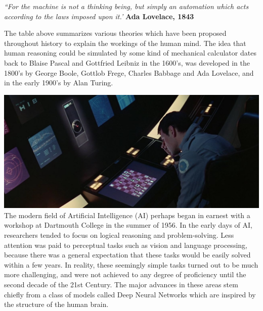 \documentclass[11pt]{article}
\begin{document}
\begin{displayquote}
\emph{``For the machine is not a thinking being, but simply an automation which acts
according to the laws imposed upon it.'}
\textbf{Ada Lovelace, 1843}
\end{displayquote}

The table above summarizes various theories which have been proposed throughout history to explain the workings of the human mind.
The idea that human reasoning could be simulated by some kind of mechanical calculator dates back to Blaise Pascal and Gottfried Leibniz in the 1600's, was developed in the 1800's by George Boole, Gottlob Frege, Charles Babbage and Ada Lovelace, and in the early 1900's by Alan Turing.

\includegraphics[width=\textwidth]{img_1}
The modern field of Artificial Intelligence (AI) perhaps began in earnest with a workshop at Dartmouth College in the summer of 1956.
In the early days of AI, researchers tended to focus on logical reasoning and problem-solving.
Less attention was paid to perceptual tasks such as vision and language processing, because there was a general expectation that these tasks would be easily solved within a few years.
In reality, these seemingly simple tasks turned out to be much more challenging, and were not achieved to any degree of proficiency until the second decade of the 21st Century.
The major advances in these areas stem chiefly from a class of models called Deep Neural Networks which are inspired by the structure of the human brain.
\end{document}
